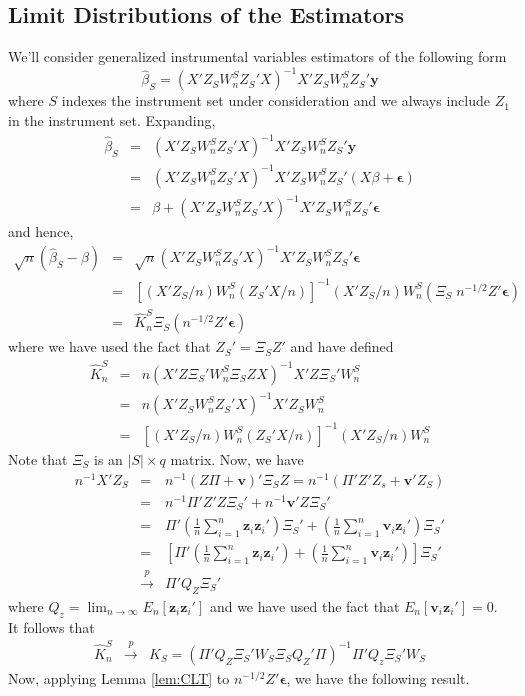 \documentclass[12pt]{article}
\theoremstyle{definition}
\begin{document}
\subsection{Limit Distributions of the Estimators}
We'll consider generalized instrumental variables estimators of the following form
$$\widehat{\beta}_S = (X'Z_S W^S_n Z_S' X)^{-1}X'Z_S W^S_n Z_S' \mathbf{y}$$
where $S$ indexes the instrument set under consideration and we always include $Z_1$ in the instrument set. Expanding,
  \begin{eqnarray*}
    \widehat{\beta}_S &=& (X'Z_S W^S_n Z_S' X)^{-1}X'Z_S W^S_n Z_S' \mathbf{y}\\
      &=& (X'Z_S W^S_n Z_S' X)^{-1}X'Z_S W^S_nZ_S'(X\beta + \boldsymbol{\epsilon})\\
      &=& \beta +(X'Z_S W^S_n Z_S' X)^{-1}X'Z_S W^S_n Z_S'\boldsymbol{\epsilon}
  \end{eqnarray*}
and hence, 
\begin{eqnarray*}
  \sqrt{n}(\widehat{\beta}_S -\beta) &=& \sqrt{n}(X'Z_S W^S_n Z_S' X)^{-1}X'Z_S W^S_n Z_S'\boldsymbol{\epsilon}\\
      &=& \left[(X'Z_S/n) W^S_n (Z_S' X/n)\right]^{-1}(X'Z_S/n) W^S_n  \left( \Xi_S \; n^{-1/2} Z' \boldsymbol{\epsilon}\right)\\
      &=& \widehat{K}_n^S \Xi_S \left(  n^{-1/2} Z' \boldsymbol{\epsilon}\right)
\end{eqnarray*}
where we have used the fact that $Z_S'  = \Xi_S Z'$ and have defined
  \begin{eqnarray*}
    \widehat{K}_n^S &=& n(X'Z \Xi_S' W^S_n \Xi_S Z X)^{-1}X' Z \Xi_S' W^S_n \\
                    &=& n(X'Z_S W^S_n Z_S' X)^{-1}X'Z_S W^S_n\\
        &=&\left[(X'Z_S/n) W^S_n (Z_S' X/n)\right]^{-1}(X'Z_S/n) W^S_n
  \end{eqnarray*}
Note that $\Xi_S$ is an $|S|\times q$ matrix. Now, we have
  \begin{eqnarray*}
     n^{-1}X' Z_S &=& n^{-1}(Z\Pi + \mathbf{v})' \Xi_S Z = n^{-1}\left(\Pi' Z' Z_s + \mathbf{v}' Z_S\right)\\
      &=&n^{-1}\Pi' Z' Z\Xi_S' + n^{-1}\mathbf{v}'Z \Xi_S' \\
      &=& \Pi' \left(\frac{1}{n}\sum_{i=1}^n \mathbf{z}_i  \mathbf{z}_i'\right) \Xi_S' + \left(\frac{1}{n} \sum_{i=1}^n \mathbf{v}_i \mathbf{z}_i' \right)\Xi_S'\\
      &=& \left[ \Pi' \left(\frac{1}{n}\sum_{i=1}^n \mathbf{z}_i  \mathbf{z}_i'\right)  + \left(\frac{1}{n} \sum_{i=1}^n \mathbf{v}_i \mathbf{z}_i' \right)\right]\Xi_S'\\
      &\overset{p}{\rightarrow}& \Pi' Q_Z \Xi_S'
  \end{eqnarray*}
where $Q_z = \lim_{n\rightarrow \infty}E_n[\mathbf{z}_i \mathbf{z}_i']$ and we have used the fact that $E_n[\mathbf{v}_i \mathbf{z}_i'] = 0$. It follows that
  \begin{eqnarray*}
    \widehat{K}_n^S &\overset{p}{\rightarrow}& K_S =   \left(\Pi' Q_Z \Xi_S' W_S \Xi_S Q_Z' \Pi\right)^{-1} \Pi'Q_z \Xi_S'W_S
  \end{eqnarray*}
Now, applying Lemma \ref{lem:CLT} to $n^{-1/2}Z'\boldsymbol{\epsilon}$, we have the following result.
\end{document}
